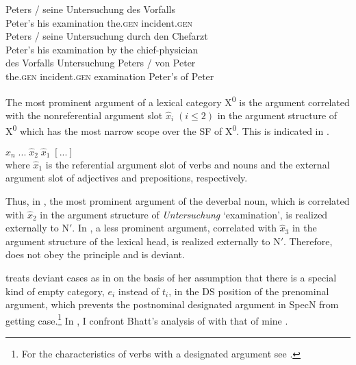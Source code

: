 \documentclass[output=paper,colorlinks,citecolor=brown]{langscibook}
\begin{document}
    \ex \label{ex:zi91:64c} 
    \gll Peters / seine Untersuchung des Vorfalls\\
        Peter's {} his examination the.\textsc{gen} incident.\textsc{gen}\\
        
    \ex \label{ex:zi91:64d} 
    \gll Peters / seine Untersuchung durch den Chefarzt\\
    Peter's {} his examination by the chief-physician\\
    \z
\ex \label{ex:zi91:65} 
    \gll \minsp{*} des Vorfalls Untersuchung Peters / von Peter\\
    {} the.\textsc{gen} incident.\textsc{gen} examination Peter's {} of Peter\\
\z

\noindent The most prominent argument of a lexical category X\textsuperscript{0} is the argument correlated with the nonreferential argument slot $\widehat{x}_{i} \; (i \leq 2)$ in the argument structure of X\textsuperscript{0} which has the most narrow scope over the SF of X\textsuperscript{0}. This is indicated in .

\ea \label{ex:zi91:66} $\widehat{x}_{n} \; ... \; \widehat{x}_{2} \; \widehat{x}_{1} \; [...]$ \\ where $\widehat{x}_{1}$ is the referential argument slot of verbs and nouns and the external argument slot of adjectives and prepositions, respectively.
\z

\noindent Thus, in , the most prominent argument of the deverbal noun, which is correlated with $\widehat{x}_{2}$ in the argument structure of \textit{Untersuchung} `examination', is realized externally to N$'$. In , a less prominent argument, correlated with $\widehat{x}_{3}$ in the argument structure of the lexical head, is realized externally to N$'$. Therefore,  does not obey the principle  and is deviant.

\citet{Bhatt89Parallels-in, Bhatt90Die-syntaktische, Bhatt90Kasuszuweisung-in} treats deviant cases as in  on the basis of her assumption that there is a special kind of empty category, $e_{i}$ instead of $t_{i}$, in the DS position of the prenominal argument, which prevents the postnominal designated argument in SpecN from getting case.\footnote{For the characteristics of verbs with a designated argument see \citet{Haider87Deutsche-Syntax}.} In , I confront Bhatt's analysis  of  with that of mine .
\end{document}
